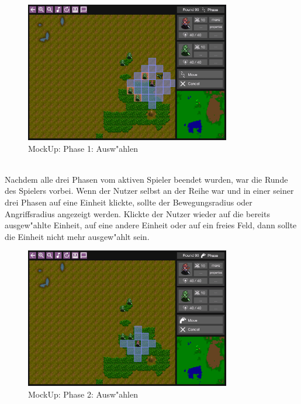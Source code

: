 \documentclass[12pt, titlepage]{scrartcl}
\begin{document}
			        \begin{figure}[H] 
    				    \centering
    				    \includegraphics[width=0.8\textwidth]{images/mockUps/Select.png}
    				    \caption{MockUp: Phase 1: Ausw"ahlen}
    				    \label{Select_1}
			        \end{figure}
			        \ \\ Nachdem alle drei Phasen vom aktiven Spieler beendet wurden, war die Runde des Spielers vorbei. Wenn der Nutzer selbst an der Reihe war und in einer seiner drei Phasen auf eine Einheit klickte, sollte der Bewegungsradius oder Angriffsradius angezeigt werden. Klickte der Nutzer wieder auf die bereits ausgew"ahlte Einheit, auf eine andere Einheit oder auf ein freies Feld, dann sollte die Einheit nicht mehr ausgew"ahlt sein. \\
                    \begin{figure}[H] 
    				    \centering
    				    \includegraphics[width=0.8\textwidth]{images/mockUps/Select2.png}
    				    \caption{MockUp: Phase 2: Ausw"ahlen}
    				    \label{Select_2}
			        \end{figure} 
\end{document}
